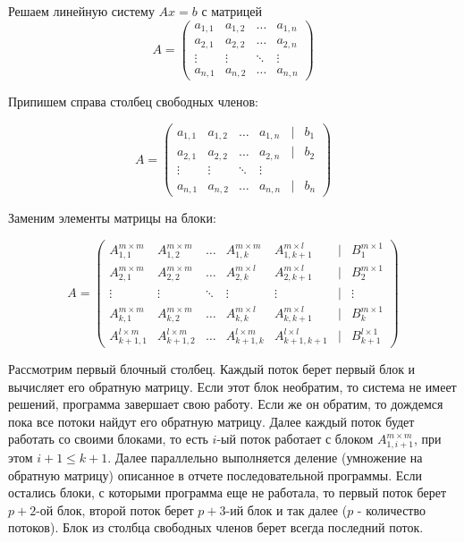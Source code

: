 \documentclass[a4paper,12pt]{article}
\begin{document}
Решаем линейную систему $Ax=b$ с матрицей
$$A=
   \begin{pmatrix}
     a_{1,1}& a_{1,2} &\ldots & a_{1,n}\\
     a_{2,1}& a_{2,2} &\ldots & a_{2,n}\\
     \vdots& \vdots &\ddots & \vdots\\
     a_{n,1}& a_{n,2} &\ldots & a_{n,n}
    \end{pmatrix}
$$

Припишем справа столбец свободных членов:

$$A=
   \begin{pmatrix}
     a_{1,1}& a_{1,2} &\ldots & a_{1,n} & \mid & b_1\\
     a_{2,1}& a_{2,2} &\ldots & a_{2,n} & \mid & b_2\\
     \vdots& \vdots &\ddots & \vdots\\
     a_{n,1}& a_{n,2} &\ldots & a_{n,n} & \mid & b_n
    \end{pmatrix}
$$

Заменим элементы матрицы на блоки:

$$
A=
   \begin{pmatrix}
     A^{m \times m}_{1,1}& A^{m \times m}_{1,2} &\ldots & A^{m \times m}_{1,k} & A^{m \times l}_{1,k+1} & \mid & B^{m \times 1}_1\\
     A^{m \times m}_{2,1}& A^{m \times m}_{2,2} &\ldots & A^{m \times l}_{2,k} & A^{m \times l}_{2,k+1} & \mid & B^{m \times 1}_2\\
     \vdots& \vdots &\ddots & \vdots & \vdots & \mid  & \vdots\\
     A^{m \times m}_{k,1}& A^{m \times m}_{k,2} &\ldots & A^{m \times l}_{k,k} & A^{m \times l}_{k,k+1} & \mid & B^{m \times 1}_k\\
     A^{l \times m}_{k+1,1} & A^{l \times m}_{k+1,2} & \ldots & A^{l \times m}_{k+1,k} & A^{l \times l}_{k+1,k+1} & \mid & B^{l \times 1}_{k+1}
    \end{pmatrix}
$$

Рассмотрим первый блочный столбец. Каждый поток берет первый блок и вычисляет его обратную матрицу. Если этот блок необратим, то система не имеет решений, программа завершает свою работу. Если же он обратим, то дождемся пока все потоки найдут его обратную матрицу. Далее каждый поток будет работать со своими блоками, то есть  $i$-ый поток работает с блоком $A^{m \times m}_{1, i + 1}$, при этом $i + 1 \leq k + 1$. Далее параллельно выполняется деление (умножение на обратную матрицу) описанное в отчете последовательной программы. Если остались блоки, с которыми программа еще не работала, то первый поток берет $p + 2$-ой блок, второй поток берет $p + 3$-ий блок и так далее ($p$ - количество потоков). Блок из столбца свободных членов берет всегда последний поток.
\end{document}
